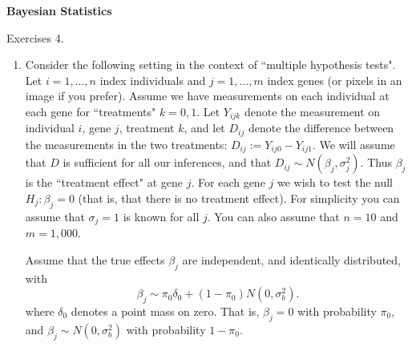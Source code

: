 \documentclass[12pt]{article}
\begin{document}
\begin{center}
{\bf
Bayesian Statistics

\smallskip

Exercises 4.
}
\smallskip

\end{center}

\bigskip

\begin{enumerate}
\item Consider the following setting in the context of ``multiple hypothesis tests".
Let $i=1,\dots,n$ index individuals and $j=1,\dots,m$ index genes (or pixels in an image if you prefer). Assume we have
measurements on each individual at each gene for ``treatments" $k=0,1$. Let $Y_{ijk}$ denote the
measurement on individual $i$, gene $j$, treatment $k$, and let $D_{ij}$ denote the difference between the measurements
in the two treatments: $D_{ij}:= Y_{ij0}-Y_{ij1}$. We will assume that $D$ is sufficient for all our inferences,
and that $D_{ij} \sim N(\beta_j, \sigma_j^2)$. Thus $\beta_j$ is the ``treatment effect" at gene $j$. For each gene $j$ we wish to test
the null $H_j: \beta_j=0$ (that is, that there is no treatment effect). For simplicity you can assume that $\sigma_j=1$ is known for all $j$. You can also assume that $n=10$ and $m=1,000$.

Assume that the true effects
$\beta_j$ are independent, and identically distributed, with 
\begin{equation}
\beta_j \sim \pi_0 \delta_0 + (1-\pi_0) N(0,\sigma^2_b).
\end{equation}
where $\delta_0$ denotes a point mass on zero.
That is, $\beta_j=0$ with probability $\pi_0$, and $\beta_j\sim  N(0,\sigma^2_b)$ with probability $1-\pi_0$.


\end{enumerate}
\end{document}
